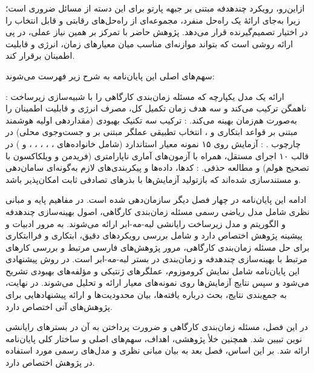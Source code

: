 ازاین‌رو، رویکرد چندهدفه مبتنی بر جبهه پارتو برای این دسته از مسائل ضروری است؛
زیرا به‌جای ارائهٔ یک راه‌حل منفرد،
مجموعه‌ای از راه‌حل‌های رقابتی و قابل انتخاب را
در اختیار تصمیم‌گیرنده قرار می‌دهد.
پژوهش حاضر با تمرکز بر همین نیاز عملی،
در پی ارائه روشی است که بتواند
موازنه‌ای مناسب میان معیارهای زمان، انرژی و قابلیت اطمینان برقرار کند.



سهم‌های اصلی این پایان‌نامه به شرح زیر فهرست می‌شوند:

:
ارائه یک مدل یکپارچه که مسئله زمان‌بندی کارگاهی را
با شبیه‌سازی زیرساخت ناهمگن ترکیب می‌کند
و سه هدف زمان تکمیل کل، مصرف انرژی و قابلیت اطمینان
را به‌صورت هم‌زمان بهینه می‌کند.
:
ترکیب سه تکنیک بهبودی
(مقداردهی اولیه هوشمند مبتنی بر قواعد ابتکاری
و ،
انتخاب تطبیقی عملگر مبتنی بر 
و جست‌وجوی محلی)
در چارچوب .
:
آزمایش روی ۱۵ نمونه معیار استاندارد
(شامل خانواده‌های ، ، ، ، ،  و )
در قالب ۱۰ اجرای مستقل،
همراه با آزمون‌های آماری ناپارامتری
(فریدمن و ویلکاکسون با تصحیح هولم)
و مطالعه حذفی.
:
کدها، داده‌ها و پیکربندی‌های لازم
به‌گونه‌ای سامان‌دهی و مستندسازی شده‌اند
که بازتولید آزمایش‌ها با بذرهای تصادفی ثابت امکان‌پذیر باشد.



ادامه این پایان‌نامه در چهار فصل دیگر سازمان‌دهی شده است.
در  مفاهیم پایه و مبانی نظری شامل
مدل ریاضی رسمی مسئله زمان‌بندی کارگاهی،
اصول بهینه‌سازی چندهدفه و الگوریتم 
و مدل زیرساخت رایانشی لبه-مه-ابر ارائه می‌شوند.
 به مرور ادبیات و پیشینه پژوهش اختصاص دارد
و شامل بررسی رویکردهای دقیق، ابتکاری و فراابتکاری
برای حل مسئله زمان‌بندی کارگاهی،
مرور پژوهش‌های فارسی مرتبط
و بررسی کارهای مرتبط با بهینه‌سازی چندهدفه و زمان‌بندی در بستر لبه-مه-ابر است.
در  روش پیشنهادی این پایان‌نامه
شامل نمایش کروموزوم، عملگرهای ژنتیکی و مؤلفه‌های بهبودی تشریح می‌شود
و سپس نتایج آزمایش‌ها روی نمونه‌های معیار ارائه و تحلیل می‌شوند.
در نهایت،  به جمع‌بندی نتایج،
بحث درباره یافته‌ها، بیان محدودیت‌ها
و ارائه پیشنهادهایی برای پژوهش‌های آتی اختصاص دارد.



در این فصل، مسئله زمان‌بندی کارگاهی و ضرورت پرداختن به آن در بسترهای
رایانشی نوین تبیین شد.
همچنین خلأ پژوهشی، اهداف، سهم‌های اصلی و ساختار کلی پایان‌نامه ارائه شد.
بر این اساس، فصل بعد به بیان مبانی نظری و مدل‌های رسمی مورد استفاده در پژوهش اختصاص دارد.
